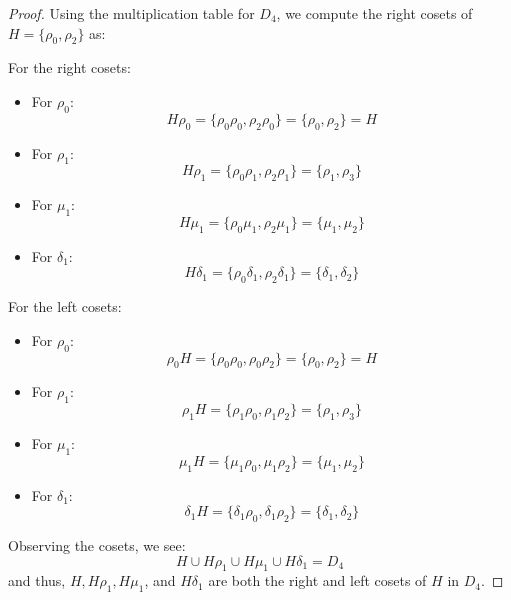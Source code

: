 \documentclass[12pt]{amsart}
\theoremstyle{definition}
\numberwithin{equation}{section}
\theoremstyle{plain}
\begin{document}
\begin{exercise}{10}
    \begin{proof}
Using the multiplication table for \( D_4 \), we compute the right cosets of \( H = \{\rho_0, \rho_2\} \) as:

For the right cosets:
\begin{itemize}
    \item For \( \rho_0 \):
    \[
    H\rho_0 = \{\rho_0\rho_0, \rho_2\rho_0\} = \{\rho_0, \rho_2\} = H
    \]
    
    \item For \( \rho_1 \):
    \[
    H\rho_1 = \{\rho_0\rho_1, \rho_2\rho_1\} = \{\rho_1, \rho_3\}
    \]
    
    \item For \( \mu_1 \):
    \[
    H\mu_1 = \{\rho_0\mu_1, \rho_2\mu_1\} = \{\mu_1, \mu_2\}
    \]
    
    \item For \( \delta_1 \):
    \[
    H\delta_1 = \{\rho_0\delta_1, \rho_2\delta_1\} = \{\delta_1, \delta_2\}
    \]
\end{itemize}

For the left cosets:
\begin{itemize}
    \item For \( \rho_0 \):
    \[
    \rho_0H = \{\rho_0\rho_0, \rho_0\rho_2\} = \{\rho_0, \rho_2\} = H
    \]
    
    \item For \( \rho_1 \):
    \[
    \rho_1H = \{\rho_1\rho_0, \rho_1\rho_2\} = \{\rho_1, \rho_3\}
    \]
    
    \item For \( \mu_1 \):
    \[
    \mu_1H = \{\mu_1\rho_0, \mu_1\rho_2\} = \{\mu_1, \mu_2\}
    \]
    
    \item For \( \delta_1 \):
    \[
    \delta_1H = \{\delta_1\rho_0, \delta_1\rho_2\} = \{\delta_1, \delta_2\}
    \]
\end{itemize}

Observing the cosets, we see:
\[
H \cup H\rho_1 \cup H\mu_1 \cup H\delta_1 = D_4
\]
and thus, \( H, H\rho_1, H\mu_1 \), and \( H\delta_1 \) are both the right and left cosets of \( H \) in \( D_4 \).
    \end{proof}
    
\end{exercise}
\vspace*{20pt}
\end{document}
